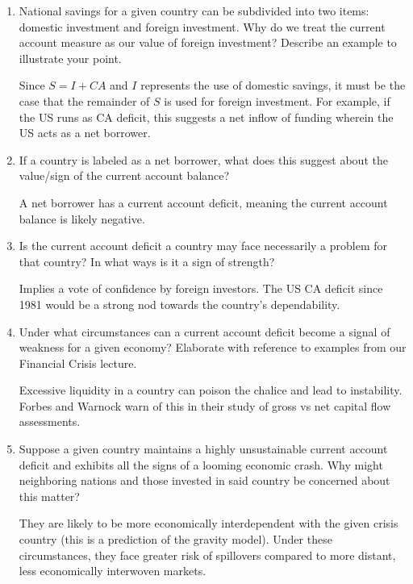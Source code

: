 \documentclass[12pt]{article}
\begin{document}
\begin{enumerate}[1)]
\item National savings for a given country can be subdivided into two items: domestic investment and foreign investment. Why do we treat the current account measure as our value of foreign investment? Describe an example to illustrate your point.

\vspace{0.2in}
Since $S = I + CA$ and $I$ represents the use of domestic savings, it must be the case that the remainder of $S$ is used for foreign investment. 
For example, if the US runs as CA deficit, this suggests a net inflow of funding wherein the US acts as a net borrower.
\vspace{0.2in}


\item If a country is labeled as a net borrower, what does this suggest about the value/sign of the current account balance?

\vspace{0.2in}
A net borrower has a current account deficit, meaning the current account balance is likely negative.
\vspace{0.2in}



\item Is the current account deficit a country may face necessarily a problem for that country? In what ways is it a sign of strength?

\vspace{0.2in}
Implies a vote of confidence by foreign investors. The US CA deficit since 1981 would be a strong nod towards the country's dependability.
\vspace{0.2in}

\item Under what circumstances can a current account deficit become a signal of weakness for a given economy? Elaborate with reference to examples from our Financial Crisis lecture.

\vspace{0.2in}
Excessive liquidity in a country can poison the chalice and lead to instability. Forbes and Warnock warn of this in their study of gross vs net capital flow assessments. 
\vspace{0.2in}

\item Suppose a given country maintains a highly unsustainable current account deficit and exhibits all the signs of a looming economic crash. 
Why might neighboring nations and those invested in said country be concerned about this matter? 

\vspace{0.2in}
They are likely to be more economically interdependent with the given crisis country (this is a prediction of the gravity model). 
Under these circumstances, they face greater risk of spillovers compared to more distant, less economically interwoven markets. 
\vspace{0.2in}


\end{enumerate}
\end{document}
